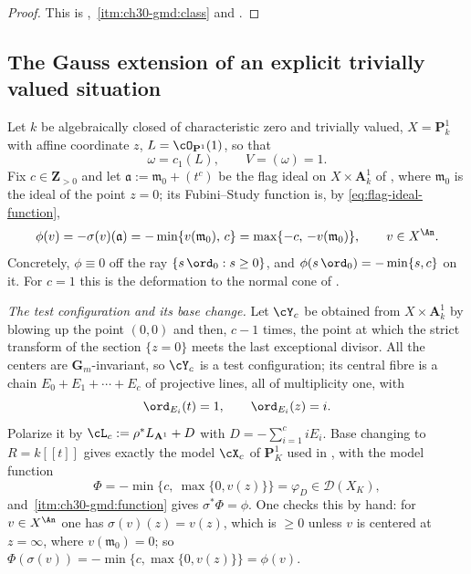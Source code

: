 \begin{proof}
This is
,
\,\cref{itm:ch30-gmd:class} and
.
\end{proof}

\subsection{The Gauss extension of an explicit trivially valued situation}
\label{sec:ch30-gauss-examples}

\begin{example}
\label{ex:ch30-gauss-normal-cone}
Let $k$ be algebraically closed of characteristic zero and trivially
valued, $X=\mathbf P^1_k$ with affine coordinate $z$,
$L=\cO_{\mathbf P^1}(1)$, so that
\[
                       \omega=c_1(L),\qquad V=(\omega)=1 .
\]
Fix $c\in\mathbf Z_{>0}$ and let $\mathfrak a:=\mathfrak m_0+(t^c)$ be
the flag ideal on $X\times\mathbf A^1_k$ of
, where $\mathfrak m_0$ is the ideal of the point
$z=0$; its Fubini--Study function is, by
\eqref{eq:flag-ideal-function},
\begin{equation}
\label{eq:ch30-gauss-example-phi}
 \phi(v)=-\sigma(v)(\mathfrak a)
        =-\min\{v(\mathfrak m_0),\,c\}
        =\max\{-c,\,-v(\mathfrak m_0)\},
 \qquad v\in X^{\An}.
\end{equation}
Concretely, $\phi\equiv0$ off the ray $\{s\,\ord_0:s\geq0\}$, and
$\phi(s\,\ord_0)=-\min\{s,c\}$ on it.  For $c=1$ this is the
deformation to the normal cone of .

\emph{The test configuration and its base change.}  Let $\cY_c$ be
obtained from $X\times\mathbf A^1_k$ by blowing up the point $(0,0)$
and then, $c-1$ times, the point at which the strict transform of the
section $\{z=0\}$ meets the last exceptional divisor.  All the centers
are $\mathbf G_m$-invariant, so $\cY_c$ is a test configuration; its
central fibre is a chain $E_0+E_1+\cdots+E_c$ of projective lines, all of
multiplicity one, with
\[
 \ord_{E_i}(t)=1,\qquad \ord_{E_i}(z)=i .
\]
Polarize it by $\cL_c:=\rho^*L_{\mathbf A^1}+D$ with
$D=-\sum_{i=1}^ciE_i$.  Base changing to $R=k[\![t]\!]$ gives exactly
the model $\cX_c$ of $\mathbf P^1_K$ used in
, with the model function
\begin{equation}
\label{eq:ch30-gauss-example-Phi}
 \Phi=-\min\bigl\{c,\ \max\{0,v(z)\}\bigr\}
 =\varphi_D\in\mathcal D(X_K),
\end{equation}
and \,\cref{itm:ch30-gmd:function}
gives $\sigma^*\Phi=\phi$.  One checks this by hand: for
$v\in X^{\An}$ one has $\sigma(v)(z)=v(z)$, which is $\geq0$ unless
$v$ is centered at $z=\infty$, where $v(\mathfrak m_0)=0$; so
$\Phi(\sigma(v))=-\min\{c,\max\{0,v(z)\}\}=\phi(v)$.


\end{example}
